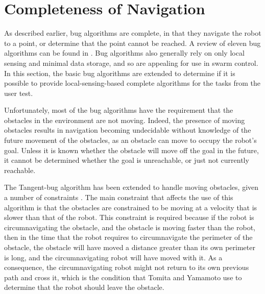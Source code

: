 \section{Completeness of Navigation}

As described earlier, bug algorithms are complete, in that they navigate the robot to a point, or determine that the point cannot be reached. A review of eleven bug algorithms can be found in \citep{ng2007performance}. 
Bug algorithms also generally rely on only local sensing and minimal data storage, and so are appealing for use in swarm control. 
In this section, the basic bug algorithms are extended to determine if it is possible to provide local-sensing-based complete algorithms for the tasks from the user test. 

Unfortunately, most of the bug algorithms have the requirement that the obstacles in the environment are not moving.
Indeed, the presence of moving obstacles results in navigation becoming undecidable without knowledge of the future movement of the obstacles, as an obstacle can move to occupy the robot's goal. 
Unless it is known whether the obstacle will move off the goal in the future, it cannot be determined whether the goal is unreachable, or just not currently reachable. 

The Tangent-bug algorithm has been extended to handle moving obstacles, given a number of constraints \citep{kamon1998tangentbug, tomita2009sensor}.
The main constraint that affects the use of this algorithm is that the obstacles are constrained to be moving at a velocity that is slower than that of the robot.
This constraint is required because if the robot is circumnavigating the obstacle, and the obstacle is moving faster than the robot, then in the time that the robot requires to circumnavigate the perimeter of the obstacle, the obstacle will have moved a distance greater than its own perimeter is long, and the circumnavigating robot will have moved with it.
As a consequence, the circumnavigating robot might not return to its own previous path and cross it, which is the condition that Tomita and Yamamoto use to determine that the robot should leave the obstacle. 

